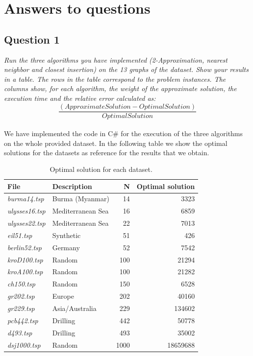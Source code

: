 \section{Answers to questions}

\subsection{Question 1}
\textit{Run the three algorithms you have implemented (2-Approximation, nearest neighbor and closest insertion) on the 13 graphs of the dataset. Show your results in a table. The rows in the table correspond to the problem instances. The columns show, for each algorithm, the weight of the approximate solution, the execution time and the relative error calculated as:
\[\frac{(ApproximateSolution - OptimalSolution)}{OptimalSolution}\]}\\

\noindent
We have implemented the code in C\# for the execution of the three algorithms on the whole provided dataset.
In the following table we show the optimal solutions for the datasets as reference for the results that we obtain.
\begin{table}[H]\centering
    \begin{tabular}{|l|l|r|r|}
    \hline
    \textbf{File} & \textbf{Description} & \textbf{N} & \textbf{Optimal solution} \\
    \hline
    \textit{burma14.tsp}	    & Burma (Myanmar)	& 14	& 3323 \\
    \textit{ulysses16.tsp}      & Mediterranean Sea & 16	& 6859 \\
    \textit{ulysses22.tsp}      & Mediterranean Sea & 22	& 7013 \\
    \textit{eil51.tsp}          & Synthetic	        & 51	& 426 \\
    \textit{berlin52.tsp}	    & Germany	        & 52 	& 7542 \\
    \textit{kroD100.tsp}	    & Random	        & 100	& 21294 \\
    \textit{kroA100.tsp}	    & Random 	        & 100	& 21282 \\
    \textit{ch150.tsp}	        & Random	        & 150	& 6528 \\
    \textit{gr202.tsp}	        & Europe	        & 202   & 40160 \\
    \textit{gr229.tsp}	        & Asia/Australia	& 229	& 134602 \\
    \textit{pcb442.tsp}         & Drilling		    & 442 	& 50778 \\
    \textit{d493.tsp}	        & Drilling	        & 493	& 35002 \\
    \textit{dsj1000.tsp}	    & Random	        & 1000 	& 18659688 \\
    \hline
    \end{tabular}
    \caption{Optimal solution for each dataset.}
\end{table}

